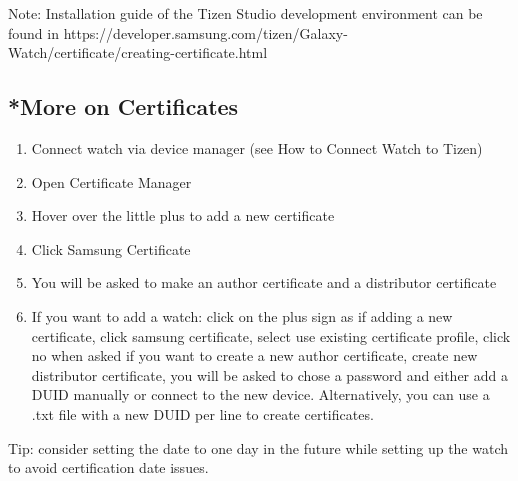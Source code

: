 \documentclass[12pt, a4paper]{article}
\begin{document}
Note: Installation guide of the Tizen Studio development environment can be found in https://developer.samsung.com/tizen/Galaxy-Watch/certificate/creating-certificate.html 

\subsection{*More on Certificates}
\begin{enumerate}
  \item Connect watch via device manager (see How to Connect Watch to Tizen)
  \item Open Certificate Manager
  \item Hover over the little plus to add a new certificate
  \item Click Samsung Certificate
  \item You will be asked to make an author certificate and a distributor certificate
  \item If you want to add a watch: click on the plus sign as if adding a new certificate, click samsung certificate, select use existing certificate profile, click no when asked if you want to create a new author certificate, create new distributor certificate, you will be asked to chose a password and either add a DUID manually or connect to the new device. Alternatively, you can use a .txt file with a new DUID per line to create certificates.
\end{enumerate}
Tip: consider setting the date to one day in the future while setting up the watch to avoid certification date issues.
\end{document}
